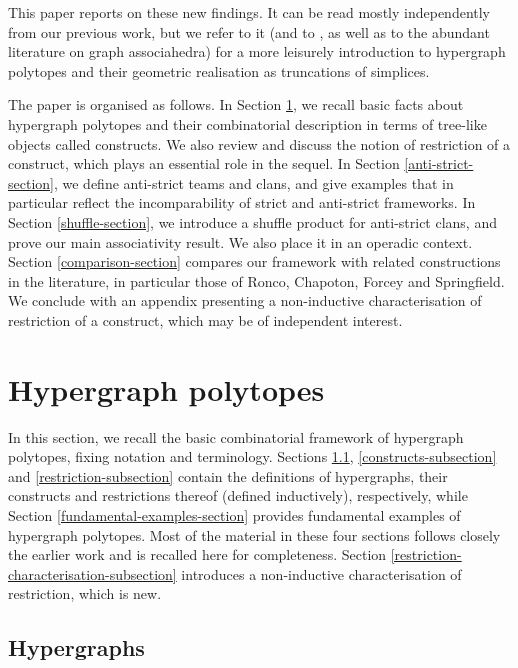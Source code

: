 \documentclass{article}
\theoremstyle{plain}
\theoremstyle{definition}
\begin{document}
\smallskip

This paper reports on these new findings. It can be read mostly independently from our previous work, but we refer to it (and to \cite{COI}, as well as to the abundant literature on graph associahedra) for a more leisurely introduction to hypergraph polytopes and their geometric realisation as truncations of   simplices.

\smallskip

The paper is organised as follows. In Section \ref{reminders-hypergraphs-section}, we recall basic facts about hypergraph polytopes and their combinatorial description in terms of  tree-like  objects called constructs. We also review and discuss the notion of restriction of a construct,  which  plays an essential role in the sequel. In Section \ref{anti-strict-section}, we define  anti-strict  teams and clans, and 
give examples that in particular reflect the incomparability of strict and anti-strict frameworks. In Section \ref{shuffle-section}, we introduce a  shuffle product for anti-strict clans, and  prove our main associativity result. {We also place it in an operadic context.}
  Section \ref{comparison-section} compares our framework with related constructions in the literature, in particular those of Ronco, Chapoton, Forcey and Springfield.  We conclude with an appendix presenting a non-inductive characterisation of restriction of a construct, which may be of independent interest.

\section{Hypergraph polytopes}
\label{reminders-hypergraphs-section}
In this section, we recall the basic combinatorial framework of hypergraph polytopes, fixing notation and terminology. Sections \ref{hypergraphs-subsection}, \ref{constructs-subsection}   and 
\ref{restriction-subsection} contain the definitions of hypergraphs, their constructs and  restrictions thereof (defined inductively), respectively, while Section \ref{fundamental-examples-section} provides fundamental examples of hypergraph polytopes. 
Most of the  material in these four sections   follows closely the earlier work  \cite{PLBJ1} and is recalled here for completeness. Section \ref{restriction-characterisation-subsection}  introduces a non-inductive characterisation of restriction, which is new.
 

\subsection{Hypergraphs} \label{hypergraphs-subsection}
 
\end{document}
